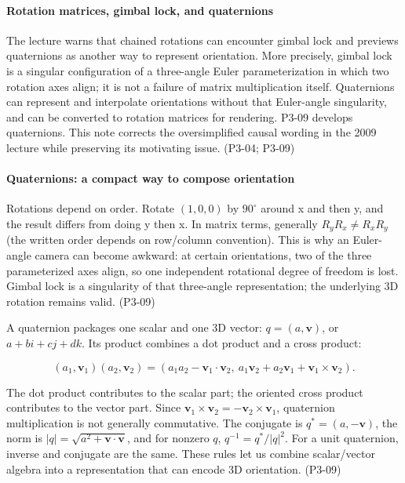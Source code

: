 \paragraph{Rotation matrices, gimbal lock, and quaternions}\label{03-visual-computing-i-ch001-rotation-matrices-gimbal-lock-and-quaternions}

\hypertarget{03-visual-computing-i-ch001-rotation-matrices-gimbal-lock-and-quaternions}{}

The lecture warns that chained rotations can encounter gimbal lock and previews quaternions as another way to represent orientation. More precisely, gimbal lock is a singular configuration of a three-angle Euler parameterization in which two rotation axes align; it is not a failure of matrix multiplication itself. Quaternions can represent and interpolate orientations without that Euler-angle singularity, and can be converted to rotation matrices for rendering. P3-09 develops quaternions. This note corrects the oversimplified causal wording in the 2009 lecture while preserving its motivating issue. (P3-04; P3-09)

\paragraph{Quaternions: a compact way to compose orientation}\label{03-visual-computing-i-ch001-quaternions-a-compact-way-to-compose-orientation}

\hypertarget{03-visual-computing-i-ch001-quaternions-a-compact-way-to-compose-orientation}{}

Rotations depend on order. Rotate \((1,0,0)\) by \(90^\circ\) around x and then y, and the result differs from doing y then x. In matrix terms, generally \(R_yR_x\ne R_xR_y\) (the written order depends on row/column convention). This is why an Euler-angle camera can become awkward: at certain orientations, two of the three parameterized axes align, so one independent rotational degree of freedom is lost. Gimbal lock is a singularity of that three-angle representation; the underlying 3D rotation remains valid. (P3-09)

A quaternion packages one scalar and one 3D vector: \(q=(a,\mathbf v)\), or \(a+bi+cj+dk\). Its product combines a dot product and a cross product:

\[
(a_1,\mathbf v_1)(a_2,\mathbf v_2)=
(a_1a_2-\mathbf v_1\cdot\mathbf v_2,\ a_1\mathbf v_2+a_2\mathbf v_1+\mathbf v_1\times\mathbf v_2).
\]

The dot product contributes to the scalar part; the oriented cross product contributes to the vector part. Since \(\mathbf v_1\times\mathbf v_2=-\mathbf v_2\times\mathbf v_1\), quaternion multiplication is not generally commutative. The conjugate is \(q^*=(a,-\mathbf v)\), the norm is \(|q|=\sqrt{a^2+\mathbf v\cdot\mathbf v}\), and for nonzero \(q\), \(q^{-1}=q^*/|q|^2\). For a unit quaternion, inverse and conjugate are the same. These rules let us combine scalar/vector algebra into a representation that can encode 3D orientation. (P3-09)

